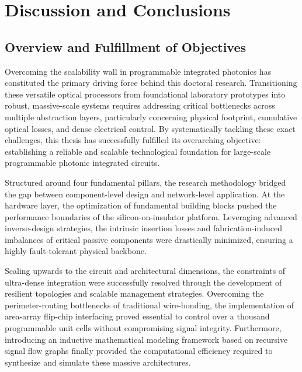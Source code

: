 
\chapter{Discussion and Conclusions}\label{chap:discussion} %

\section{Overview and Fulfillment of Objectives}
\label{sec:ch6_overview}

Overcoming the scalability wall in programmable integrated photonics has constituted the primary 
driving force behind this doctoral research. Transitioning these versatile optical processors from 
foundational laboratory prototypes into robust, massive-scale systems requires addressing critical 
bottlenecks across multiple abstraction layers, particularly concerning physical footprint, 
cumulative optical losses, and dense electrical control. By systematically tackling these exact 
challenges, this thesis has successfully fulfilled its overarching objective: establishing a 
reliable and scalable technological foundation for large-scale programmable photonic integrated 
circuits.

Structured around four fundamental pillars, the research methodology bridged the gap between 
component-level design and network-level application. At the hardware layer, the optimization of 
fundamental building blocks pushed the performance boundaries of the silicon-on-insulator platform. 
Leveraging advanced inverse-design strategies, the intrinsic insertion losses and 
fabrication-induced imbalances of critical passive components were drastically minimized, ensuring 
a highly fault-tolerant physical backbone.

Scaling upwards to the circuit and architectural dimensions, the constraints of ultra-dense 
integration were successfully resolved through the development of resilient topologies and scalable 
management strategies. Overcoming the perimeter-routing bottlenecks of traditional wire-bonding, 
the implementation of area-array flip-chip interfacing proved essential to control over a thousand 
programmable unit cells without compromising signal integrity. Furthermore, introducing an 
inductive mathematical modeling framework based on recursive signal flow graphs finally provided 
the computational efficiency required to synthesize and simulate these massive architectures.

